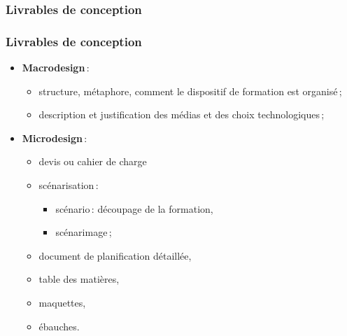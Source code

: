						\subsubsection{Livrables de conception} 
							\begin{frame}[allowframebreaks]
							\frametitle{Livrables de conception}
                        			
							\begin{itemize}
							\item \textbf{Macrodesign}\,: 
								\begin{itemize}
								\item structure, métaphore, comment le dispositif de formation est organisé\,;
								\item description et justification des médias et des choix technologiques\,;
								\end{itemize}
							\framebreak
							\item \textbf{Microdesign}\,:
								\begin{itemize}
								\item devis ou cahier de charge
								\item scénarisation\,: 
									\begin{itemize}
									\item scénario\,: découpage de la formation,
									\item scénarimage\,;
									\end{itemize}
								\item document de planification détaillée,
								\item table des matières,
								\item maquettes,
								\item ébauches.
								\end{itemize}								
							\end{itemize}						
					\end{frame}
					
					
